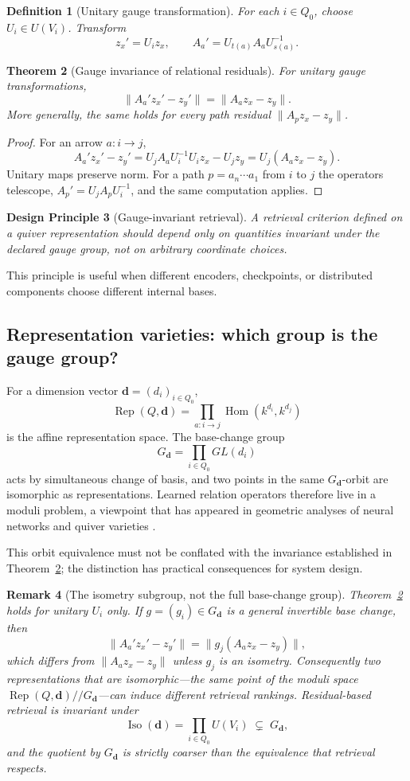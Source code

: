 \documentclass[11pt]{article}
\newtheorem{definition}{Definition}[section]
\newtheorem{theorem}[definition]{Theorem}
\newtheorem{remark}[definition]{Remark}
\newtheorem{principle}[definition]{Design Principle}
\newcommand{\Rep}{\operatorname{Rep}}
\newcommand{\Hom}{\operatorname{Hom}}
\newcommand{\Iso}{\operatorname{Iso}}
\begin{document}
\begin{definition}[Unitary gauge transformation]
For each $i\in Q_0$, choose $U_i\in U(V_i)$. Transform
\[
z_x' = U_i z_x,\qquad A_a'=U_{t(a)}A_aU_{s(a)}^{-1}.
\]
\end{definition}

\begin{theorem}[Gauge invariance of relational residuals]
\label{thm:gauge}
For unitary gauge transformations,
\[
\|A_a' z_x'-z_y'\|=\|A_a z_x-z_y\|.
\]
More generally, the same holds for every path residual $\|A_p z_x-z_y\|$.
\end{theorem}
\begin{proof}
For an arrow $a:i\to j$,
\[
A_a'z_x'-z_y'=U_jA_aU_i^{-1}U_i z_x-U_jz_y=U_j(A_az_x-z_y).
\]
Unitary maps preserve norm. For a path $p=a_n\cdots a_1$ from $i$ to $j$ the operators telescope, $A_p'=U_{j}A_pU_{i}^{-1}$, and the same computation applies.
\end{proof}

\begin{principle}[Gauge-invariant retrieval]
A retrieval criterion defined on a quiver representation should depend only on quantities invariant under the declared gauge group, not on arbitrary coordinate choices.
\end{principle}

This principle is useful when different encoders, checkpoints, or distributed components choose different internal bases.

\subsection{Representation varieties: which group is the gauge group?}
\label{sec:moduli}
For a dimension vector $\bm d=(d_i)_{i\in Q_0}$,
\[
\Rep(Q,\bm d)=\prod_{a:i\to j}\Hom(k^{d_i},k^{d_j})
\]
is the affine representation space. The base-change group
\[
G_{\bm d}=\prod_{i\in Q_0}GL(d_i)
\]
acts by simultaneous change of basis, and two points in the same $G_{\bm d}$-orbit are isomorphic as representations. Learned relation operators therefore live in a moduli problem, a viewpoint that has appeared in geometric analyses of neural networks and quiver varieties \citep{jeffreys2021,armenta2020,ganev2022}.

This orbit equivalence must not be conflated with the invariance established in Theorem~\ref{thm:gauge}; the distinction has practical consequences for system design.

\begin{remark}[The isometry subgroup, not the full base-change group]
\label{rem:gauge-gap}
Theorem~\ref{thm:gauge} holds for unitary $U_i$ only. If $g=(g_i)\in G_{\bm d}$ is a general invertible base change, then
\[
\|A_a'z_x'-z_y'\|=\|g_{j}(A_az_x-z_y)\|,
\]
which differs from $\|A_az_x-z_y\|$ unless $g_j$ is an isometry. Consequently two representations that are \emph{isomorphic}---the same point of the moduli space $\Rep(Q,\bm d)/\!\!/G_{\bm d}$---can induce different retrieval rankings. Residual-based retrieval is invariant under
\[
\Iso(\bm d)=\prod_{i\in Q_0}U(V_i)\;\subsetneq\;G_{\bm d},
\]
and the quotient by $G_{\bm d}$ is strictly coarser than the equivalence that retrieval respects.
\end{remark}
\end{document}

